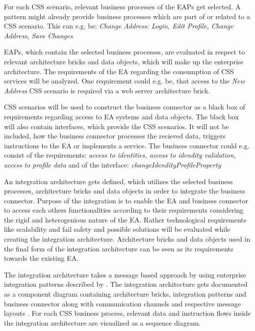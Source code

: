 \documentclass{article}
\begin{document}
For each CSS scenario, relevant business processes of the EAPs get selected. A pattern might already
provide business processes which are part of or related to a CSS scenario.
This can e.g. be: \textit{Change Address: Login, Edit Profile, Change Address, Save Changes}

EAPs, which contain the selected business processes, are evaluated in respect to relevant architecture 
bricks and data objects, which will make up the enterprise architecture. The requirements of the EA 
regarding the consumption of CSS services will be analyzed. One requirement could e.g. be, that access to 
the \textit{New Address} CSS scenario is required via a web server architecture brick.

CSS scenarios will be used to construct the business connector as a black box of requirements regarding 
access to EA systems and data objects. The black box will also contain interfaces, which provide the CSS 
scenarios. It will not be included, how the business 
connector processes the recieved data, triggers instructions to the EA or implements a service.
The business connector could e.g. consist of the requirements: \textit{access to identities, access to idendity validation, 
access to profile data} and of the interface: \textit{changeIdendityProfileProperty}

An integration architecture gets defined, which utilizes the selected business processes, architecture 
bricks and data objects in order to integrate the business connector. Purpose of the integration is to enable 
the EA and business connector to access each others functionalities according to their requirements considering 
the rigid and heterogenious nature of the EA. Rather technological requirements like scalability and fail safety 
and possible solutions will be evaluated while creating the integration architecture.
Architecture bricks and data objects used in the final form of the 
integration architecture can be seen as its requirements towards the existing EA.

The integration architecture takes a message based approach by using enterprise integration patterns described
by \cite{integrationPatterns}.
The integration architecture gets documented as a component diagram
containing architecture bricks, integration patterns and business connector along with communication 
channels and respective message layouts \cite[cf. 16 ff.]{integrationPatterns}.
For each CSS business process, relevant data and instruction flows inside the integration architecture 
are visualized as a sequence diagram.
\end{document}
